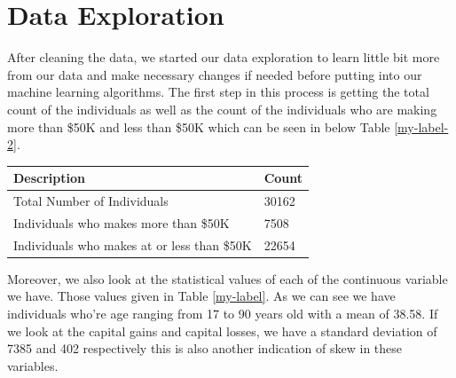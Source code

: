 \documentclass[sigconf]{acmart}
\begin{document}
\section{Data Exploration}

After cleaning the data, we started our data exploration to learn little bit more from our data and make necessary changes if needed before putting into our machine learning algorithms. The first step in this process is getting the total count of the individuals as well as the count of the individuals who are making more than \$50K and less than \$50K which can be seen in below Table \ref{my-label-2}.

\begin{center}
\centering
\begin{tabular}{ll}
\hline
\multicolumn{1}{|l|}{\textbf{Description}} & \multicolumn{1}{l|}{\textbf{Count}} \\ \hline
Total Number of Individuals                & 30162                               \\ \hline
Individuals who makes more than \$50K        & 7508                                \\ \hline
Individuals who makes at or less than \$50K  & 22654                              \\ \hline
\end{tabular}
\label{my-label-2}
\end{center}

\par Moreover, we also look at the statistical values of each of the continuous variable we have. Those values given in Table \ref{my-label}. As we can see we have individuals who're age ranging from 17 to 90 years old with a mean of 38.58. If we look at the capital gains and capital losses, we have a standard deviation of 7385 and 402 respectively this is also another indication of skew in these variables. 
\end{document}
